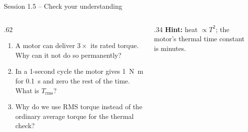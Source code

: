 \documentclass[aspectratio=169,10pt]{beamer}
\begin{document}
\begin{frame}{Session 1.5 -- Check your understanding}
\begin{columns}[T]
\begin{column}{.62\textwidth}
\begin{keybox}
\begin{enumerate}\setlength\itemsep{6pt}
\item A motor can deliver $3\times$ its rated torque. Why can it not do so permanently?
\item In a 1-second cycle the motor gives \SI{1}{\newton\metre} for \SI{0.1}{\second} and zero the rest of the time. What is $T_\text{rms}$?
\item Why do we use RMS torque instead of the ordinary average torque for the thermal check?
\end{enumerate}
\end{keybox}
\end{column}
\begin{column}{.34\textwidth}
\small
\textbf{Hint:} heat $\propto T^2$; the motor's thermal time constant is minutes.
\end{column}
\end{columns}
\end{frame}
\end{document}
